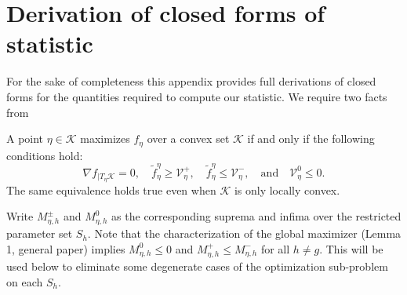 \documentclass{imsart}
\newcommand{\grad}{\nabla}
\newcommand{\V}{\mathcal{V}}\endlocaldefs
\newcommand{\K}{\mathcal{K}}
\newcommand\tf{\widetilde{f}}
\begin{document}
%
%
% 

\appendix
\section{Derivation of closed forms of statistic}

For the sake of completeness this appendix provides full derivations
of closed forms for the quantities required to compute our
statistic. We require two facts from \cite{tests:adaptive}

A point $\eta \in \K$ maximizes $f_\eta$ over a convex
set $\K$ if and only if the following conditions hold: 
\begin{equation}
\label{eq:maxcond}
\grad f_{|T_{\eta}\K} = 0, \quad
\tf^{\eta}_{\eta} \geq \V^+_{\eta}, \quad
\tf^{\eta}_{\eta} \leq \V^-_{\eta}, \quad \text{and} \quad
\V^0_{\eta} \leq 0.
\end{equation}
The same equivalence holds true even when $\K$ is only locally
convex. 

Write $M^{\pm}_{\eta, h}$ and $M^0_{\eta, h}$ as the corresponding suprema and infima over the restricted parameter set $S_h$. Note that the characterization of the global maximizer (Lemma 1, general paper) implies $M^0_{\eta, h} \leq 0$ and $M^+_{\eta, h} \leq M^-_{\eta, h}$ for all $h \neq g$. This will be used below to eliminate some degenerate cases of the optimization sub-problem on each $S_h$.
\end{document}
